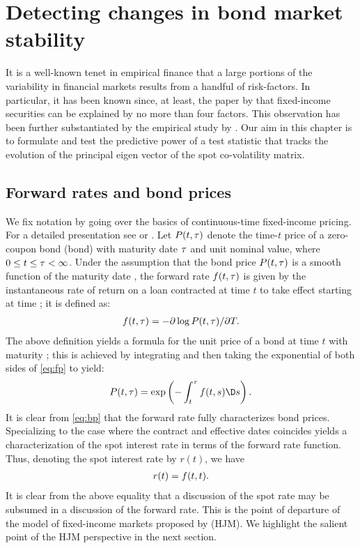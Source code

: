 \chapter{Detecting  changes in  bond market stability}
It is a well-known tenet in empirical finance that a large portions of the variability in financial markets results from a handful of risk-factors. In particular, it has been known since, at least, the paper by \cite{Litterman1991} that fixed-income securities can be explained by no more than four factors. This observation has been further substantiated by the  empirical  study by \cite{Bouchaud1999}. Our aim in this chapter is to  formulate and test the predictive power of a test statistic that tracks the evolution of the principal eigen vector of the spot co-volatility matrix.    
\section{Forward rates and bond prices}
We fix notation by going over the basics of continuous-time fixed-income pricing. For a detailed presentation see  \cite{Carmona2006} or \cite{Heath1992}.  Let $P(t,\tau)$ denote the time-$t$ price of a zero-coupon bond (bond) with maturity date $\tau$ and unit nominal value, where $0\le t\le \tau < \infty$. Under the assumption that the bond price $P(t,\tau)$ is a smooth function of the maturity date \T,  the forward rate $f(t,\tau)$ is given by the instantaneous rate of return on a loan contracted at time $t$ to take effect starting at time \T; it is defined as:
\begin{align}
  f(t,\tau) = -\partial \log P(t, \tau)/\partial T .
  \label{eq:fp}
\end{align}
The above definition yields a formula for the unit price of a bond at time $t$ with maturity \T; this is achieved by  integrating and then taking the exponential of  both sides of \eqref{eq:fp} to yield:
\begin{align}
  P(t, \T) = \exp \left(-\int_t^\T f(t,s) \D s \right).
  \label{eq:bp}
\end{align}
It is  clear from \eqref{eq:bp} that the forward rate fully characterizes bond prices. Specializing to the case where the contract and effective dates coincides yields a characterization of the spot interest rate in terms of the forward rate function. Thus, denoting the spot interest rate by $r(t)$, we have
\begin{align}
  r(t) = f(t,t).\notag
  \label{}
\end{align}
It is  clear from the above equality that a discussion of the spot rate may be subsumed in a discussion of the forward rate. This is the point of departure of the model of fixed-income markets proposed by \cite{Heath1992} (HJM). We highlight the salient point of the HJM perspective in the next section. 
